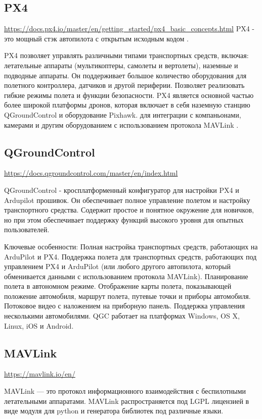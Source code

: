 \subsection{PX4}
\url{https://docs.px4.io/master/en/getting_started/px4_basic_concepts.html}
PX4 - это мощный стэк автопилота с открытым исходным кодом .

PX4 позволяет управлять различными типами транспортных средств, включая: летательные аппараты (мультикоптеры, самолеты и вертолеты), наземные и подводные аппараты. Он поддерживает большое количество оборудования для полетного контроллера, датчиков и другой периферии.
Позволяет реализовать гибкие режимы полета и функции безопасности.
PX4 является основной частью более широкой платформы дронов, которая включает в себя наземную станцию QGroundControl и оборудование Pixhawk. для интеграции с компаньонами, камерами и другим оборудованием с использованием протокола MAVLink
. 

\subsection{QGroundControl}
\url{https://docs.qgroundcontrol.com/master/en/index.html}

QGroundControl - кросплатформенный конфигуратор для настройки PX4 и Ardupilot прошивок. Он обеспечивает полное управление полетом и настройку транспортного средства. Содержит простое и понятное окружение для новичков, но при этом обеспечивает поддержку функций высокого уровня для опытных пользователей.

Ключевые особенности:
Полная настройка транспортных средств, работающих на ArduPilot и PX4.
Поддержка полета для транспортных средств, работающих под управлением PX4 и ArduPilot (или любого другого автопилота, который обменивается данными с использованием протокола MAVLink).
Планирование полета в автономном режиме.
Отображение карты полета, показывающей положение автомобиля, маршрут полета, путевые точки и приборы автомобиля.
Потоковое видео с наложением на приборную панель.
Поддержка управления несколькими автомобилями.
QGC работает на платформах Windows, OS X, Linux, iOS и Android.

\subsection{MAVLink}
\url{https://mavlink.io/en/}

MAVLink — это протокол информационного взаимодействия с беспилотными летательными аппаратами. MAVLink распространяется под LGPL лицензией в виде модуля для python и генератора библиотек под различные языки. 

